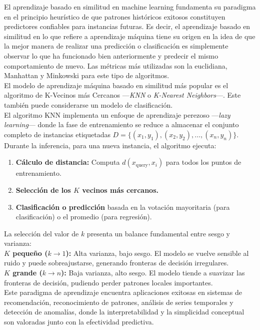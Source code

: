 \documentclass[12pt]{article}
\begin{document}
El aprendizaje basado en similitud en machine learning fundamenta su paradigma en el principio heurístico de que patrones históricos exitosos constituyen predictores confiables para instancias futuras. Es decir, el aprendizaje basado en similitud en lo que refiere a aprendizaje máquina tiene su origen en la idea de que la mejor manera de realizar una predicción o clasificación es simplemente observar lo que ha funcionado bien anteriormente y predecir el mismo comportamiento de nuevo. Las métricas más utilizadas son la euclidiana, Manhattan y Minkowski para este tipo de algoritmos.
\\
El modelo de aprendizaje máquina basado en similitud más popular es el algoritmo de K-Vecinos más Cercanos ---\textit{KNN} o \textit{K-Nearest Neighbors}---. Este también puede considerarse un modelo de clasificación.
\\
El algoritmo KNN implementa un enfoque de aprendizaje perezoso ---\textit{lazy learning}--- donde la fase de entrenamiento se reduce a almacenar el conjunto completo de instancias etiquetadas $D = \{(x_1,y_1), (x_2,y_2), \ldots, (x_n,y_n)\}$. Durante la inferencia, para una nueva instancia, el algoritmo ejecuta:
    \begin{enumerate}
        \item \textbf{Cálculo de distancia:} Computa $d(x_{\text{query}}, x_i)$ para todos los puntos de entrenamiento.
        \item \textbf{Selección de los $K$ vecinos más cercanos.}
        \item \textbf{Clasificación o predicción} basada en la votación mayoritaria (para clasificación) o el promedio (para regresión).
    \end{enumerate}

La selección del valor de $k$ presenta un balance fundamental entre sesgo y varianza:
\\
\textbf{$K$ pequeño ($k \to 1$):} Alta varianza, bajo sesgo. El modelo se vuelve sensible al ruido y puede sobreajustarse, generando fronteras de decisión irregulares.
\\
\textbf{$K$ grande ($k \to n$):} Baja varianza, alto sesgo. El modelo tiende a suavizar las fronteras de decisión, pudiendo perder patrones locales importantes.
\\
Este paradigma de aprendizaje encuentra aplicaciones exitosas en sistemas de recomendación, reconocimiento de patrones, análisis de series temporales y detección de anomalías, donde la interpretabilidad y la simplicidad conceptual son valoradas junto con la efectividad predictiva.
\end{document}
